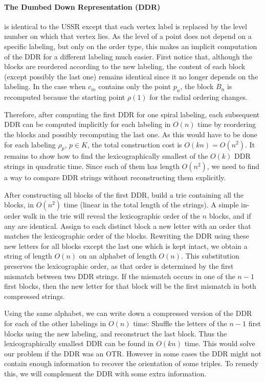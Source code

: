 \documentclass[leqno,12pt]{article}
\begin{document}
\paragraph{The Dumbed Down Representation (DDR)}
 is identical to the USSR except that
each vertex label is replaced by the level number on which that vertex lies.
As the level of a point does not depend on a specific labeling, but only
on the order type, this makes an implicit computation of the DDR for a different labeling
much easier. First notice that, although the blocks are reordered
according to the new labeling, the content of each block (except
possibly the last one) remains identical since it no longer depends on
the labeling. In the case when $c_m$ contains only the point $p_n$, the
block $B_n$ is recomputed because the starting point $\rho(1)$ for
the radial ordering
changes.

Therefore, after 
computing the first DDR for one spiral labeling, each
subsequent DDR can be computed implicitly for each
labeling
 in $O(n)$
time by reordering the blocks and possibly recomputing the last one.
As this would have to be
 done for each labeling $\rho_p$, $p\in K$,
the total construction cost is  $O(kn) = O(n^2)$.
It remains to show how to 
 find the lexicographically smallest
of the $O(k)$ DDR strings
in quadratic time. Since each of them has length $O(n^2)$, we
need to find a way to compare DDR strings without reconstructing them
explicitly. 

After constructing all blocks of the first DDR, build a
trie containing all the blocks, in $O(n^2)$ time (linear in the total
length of the strings). 
A  simple
 in-order walk in the
trie
 will reveal
the lexicographic order of the $n$ blocks, and if any are
identical. Assign to each distinct block a new letter with an order
that matches
 the lexicographic order of the blocks. 
 Rewriting
the DDR using these new letters for all blocks except the last one
which is kept intact, we obtain a string of length $O(n)$ on an
alphabet of length $O(n)$.  This substitution preserves the
lexicographic order, as that order is determined by the first mismatch
between two DDR strings. If the mismatch occurs in one of the $n{-}1$
first blocks, then the new letter for that block will be the first
mismatch in both compressed strings.

Using the same alphabet, we can 
write down
 a compressed version of the DDR for each of the other labelings
in $O(n)$ time: Shuffle the letters of the $n{-}1$ first blocks using
the new labeling, and reconstruct the last block.
Thus the lexicographically smallest DDR can be found in $O(kn)$
time.
This would solve our problem if the DDR was an OTR. However in some
cases the DDR might not contain enough information to recover the
orientation of some triples. To remedy this, we will complement the
DDR with some extra information. \\
\end{document}
